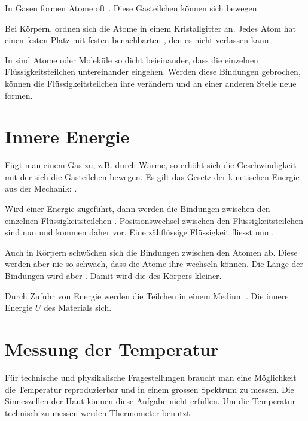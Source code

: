 \documentclass[12pt,a4paper,twoside]{article}
\begin{document}
In Gasen formen Atome oft . Diese Gasteilchen können sich  bewegen.

Bei  Körpern, ordnen sich die Atome in einem Kristallgitter an.
Jedes Atom hat einen festen Platz mit festen benachbarten , den es nicht verlassen kann.

In  sind Atome oder Moleküle so dicht beieinander, dass die einzelnen Flüssigkeitsteilchen  untereinander eingehen.
Werden diese  Bindungen gebrochen, 
können die Flüssigkeitsteilchen ihre  verändern und an einer anderen Stelle neue  formen.

\StoppLueckentext

\section*{Innere Energie}
\StartLueckentext
Fügt man einem Gas  zu, z.B. durch Wärme, so erhöht sich die Geschwindigkeit mit der sich die Gasteilchen bewegen.
Es gilt das Gesetz der kinetischen Energie aus der Mechanik: .

Wird einer  Energie zugeführt, dann werden die Bindungen zwischen den einzelnen Flüssigkeitsteilchen .
Positionswechsel zwischen den Flüssigkeitsteilchen sind nun  und kommen daher  vor.
Eine zähflüssige Flüssigkeit fliesst nun .

Auch in  Körpern schwächen sich die Bindungen zwischen den Atomen ab.
Diese werden aber nie so schwach, dass die Atome ihre  wechseln können.
Die Länge der Bindungen wird aber . Damit wird die  des Körpers kleiner.


Durch Zufuhr von Energie werden die Teilchen in einem Medium . Die innere Energie $U$ des Materials  sich.

\StoppLueckentext

\newpage


\section*{Messung der Temperatur}
Für technische und physikalische Fragestellungen braucht man eine Möglichkeit die Temperatur
reproduzierbar und in einem grossen Spektrum zu messen. Die Sinneszellen der Haut können diese Aufgabe nicht erfüllen.
Um die Temperatur technisch zu messen werden Thermometer benutzt.
\end{document}
